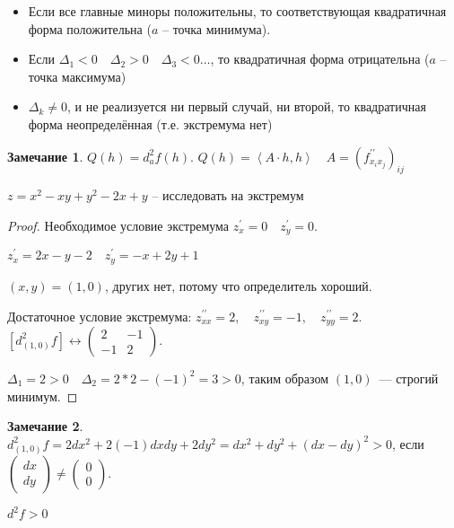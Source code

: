 \documentclass{book}
\newcommand{\p}[1]{#1^{\prime}}
\newcommand{\pp}[1]{#1^{\prime\prime}}
\theoremstyle{definition}
\newtheorem*{note}{Замечание}
\begin{document}
        \begin{theorem}
            \begin{itemize}
                \item Если все главные миноры положительны, то соответствующая квадратичная форма положительна ($a$ -- точка минимума).
                \item Если  $\Delta_1 <0\quad \Delta_2>0\quad \Delta_3 <0 \ldots$, то квадратичная форма отрицательна ($a$ -- точка максимума) 
                \item $\Delta_k\neq 0$, и не реализуется ни первый случай, ни второй, то квадратичная форма неопределённая (т.е. экстремума нет)
            \end{itemize}
        \end{theorem}

        \begin{note}
            $Q(h) = d^2_a f(h)$.
            $Q(h) = \left<A\cdot h, h \right>\quad A = \left( \pp f_{x_ix_j} \right)_{ij} $
        \end{note}

        \begin{problem}
           $z = x^2-xy+y^2-2x+y$ -- исследовать на экстремум 
        \end{problem}
        \begin{proof}
            Необходимое условие экстремума $\p z_x = 0\quad \p z_y = 0$.

             $\p z_x = 2x - y - 2\quad \p z_y = -x + 2y +  1$

             $(x, y) = (1, 0)$, других нет, потому что определитель хороший.

             Достаточное условие экстремума:
             $\pp z_{x x} = 2, \quad \pp z_{xy} = -1,\quad \pp z_{yy}=2$.
             $\left[ d^2_{\left( 1, 0 \right) }f \right] \longleftrightarrow \begin{pmatrix} 2&-1\\-1&2 \end{pmatrix}$. 

             $\Delta_1 = 2>0\quad \Delta_2 = 2*2 - (-1)^2 = 3>0$, таким образом $(1, 0)$~--- строгий минимум.
        \end{proof}

        \begin{note}
            $d^2_{(1,0)}f = 2dx^2 + 2(-1)dxdy + 2dy^2 = dx^2 + dy^2 + (dx-dy)^2 >0$, если $\begin{pmatrix} dx\\dy \end{pmatrix} \neq \begin{pmatrix} 0\\0 \end{pmatrix}$.

            $d^2f>0$
        \end{note}
\end{document}
